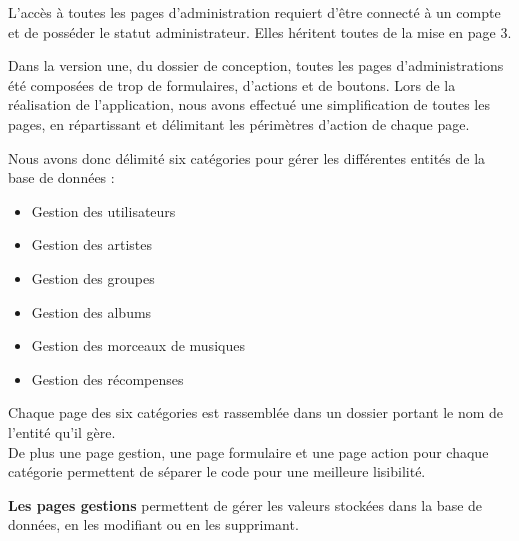         \begin{paragraphe}
            L'accès à toutes les pages d'administration requiert d'être connecté à un compte et de posséder le statut administrateur. Elles héritent toutes de la mise en page 3.
        \end{paragraphe}
        
        \begin{paragraphe}
            Dans la version une, du dossier de conception, toutes les pages d'administrations été composées de trop de formulaires, d'actions et de boutons.
            Lors de la réalisation de l'application, nous avons effectué une simplification de toutes les pages, en répartissant et délimitant les périmètres d'action de chaque page.
        \end{paragraphe}
    
        \begin{paragraphe}
            Nous avons donc délimité six catégories pour gérer les différentes entités de la base de données :
            \vspace{1em}
            \begin{itemize}
                \item Gestion des utilisateurs
                \item Gestion des artistes
                \item Gestion des groupes
                \item Gestion des albums
                \item Gestion des morceaux de musiques
                \item Gestion des récompenses
            \end{itemize}
        \end{paragraphe}
        
        \begin{paragraphe}
            Chaque page des six catégories est rassemblée dans un dossier portant le nom de l'entité qu'il gère. \\
            De plus une page gestion, une page formulaire et une page action pour chaque catégorie permettent de séparer le code pour une meilleure lisibilité.
        \end{paragraphe}

        \begin{paragraphe}
            \textbf{Les pages gestions} permettent de gérer les valeurs stockées dans la base de données, en les modifiant ou en les supprimant.
        \end{paragraphe}
        
